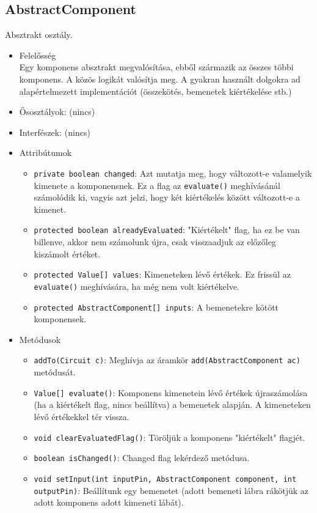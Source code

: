 \subsection{AbstractComponent}
Absztrakt osztály.
\begin{itemize}
\item Felelősség\\
Egy komponens absztrakt megvalósítása, ebből származik az összes többi  komponens. A közös logikát valósítja meg. A gyakran használt dolgokra  ad alapértelmezett implementációt (összekötés, bemenetek kiértékelése stb.)
\item Ősosztályok: (nincs)
\item Interfészek: (nincs)
\item Attribútumok $\ $
\begin{itemize}
	\item \texttt{private boolean changed}: Azt mutatja meg, hogy változott-e valamelyik kimenete a komponensnek. Ez a flag az \texttt{evaluate()} meghívásánál számolódik ki, vagyis azt jelzi, hogy két kiértékelés között változott-e a kimenet.
	\item \texttt{protected boolean alreadyEvaluated}: "Kiértékelt" flag, ha ez be van billenve, akkor nem számolunk újra, csak visszaadjuk az előzőleg kiszámolt értéket.
	\item \texttt{protected Value[] values}: Kimeneteken lévő értékek. Ez frissül az \texttt{evaluate()} meghívására, ha még nem volt kiértékelve.
	\item \texttt{protected AbstractComponent[] inputs}: A bemenetekre kötött komponensek.
\end{itemize}
\item Metódusok$\ $
\begin{itemize}
	\item \texttt{addTo(Circuit c)}: Meghívja az áramkör \texttt{add(AbstractComponent ac)} metódusát.
	\item \texttt{Value[] evaluate()}: Komponens kimenetein lévő értékek újraszámolása (ha a kiértékelt flag, nincs beállítva) a bemenetek alapján. A kimeneteken lévő értékekkel tér vissza.
	\item \texttt{void clearEvaluatedFlag()}: Töröljük a komponens "kiértékelt" flagjét.
	\item \texttt{boolean isChanged()}: Changed flag lekérdező metódusa.
	\item \raggedright \texttt{void setInput(int inputPin, AbstractComponent component, int outputPin)}: Beállítunk egy bemenetet (adott bemeneti lábra rákötjük az adott komponens adott kimeneti lábát).
\end{itemize}
\end{itemize}

